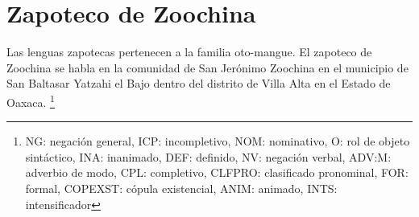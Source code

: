 \section*{Zapoteco de Zoochina}

\noindent Las lenguas zapotecas pertenecen a la familia oto-mangue. El zapoteco de Zoochina se habla en la comunidad de San Jerónimo Zoochina en el municipio de San Baltasar Yatzahi el Bajo dentro del distrito de Villa Alta en el Estado de Oaxaca. 
\footnote{NG: negación general, ICP: incompletivo, NOM: nominativo, O: rol de objeto sintáctico, INA: inanimado, DEF: definido, NV: negación verbal, ADV:M: adverbio de modo, CPL: completivo, CLFPRO: clasificado pronominal, FOR: formal, COPEXST: cópula existencial, ANIM: animado, INTS: intensificador} \vspace{0.5cm}

